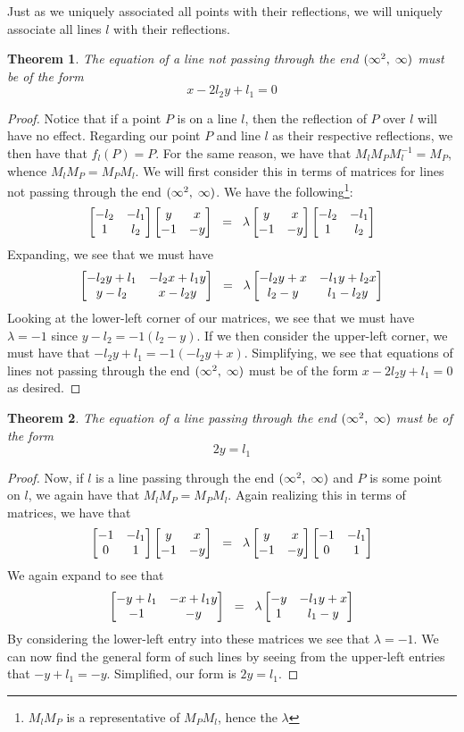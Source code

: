 \documentclass[12pt]{article}
\newcommand{\inv}{^{-1}}
\newcommand{\spceq}{\hspace{2mm} = \hspace{2mm}}
\newcommand{\ttc}{, \hspace{1mm}}
\newcommand{\lftmat}[4]{\begin{bmatrix} {#1} & {#2} \\ {#3} & {#4} \end{bmatrix}}
\newcommand{\pointmat}[2]{\lftmat{{#2}}{{#1}}{-1}{-{#2}}}
\newcommand{\stanpointmat}{\pointmat{x}{y}}
\newcommand{\linenoendmat}[2]{\begin{bmatrix} -{#2} & -{#1} \\ 1 & {#2} \end{bmatrix}}
\newcommand{\stanlinenoendmat}{\linenoendmat{l_1}{l_2}}
\newcommand{\lineendmat}[2]{\begin{bmatrix} -1 & -{#1} \\ 0 & 1 \end{bmatrix}}
\newcommand{\stanlineendmat}{\lineendmat{l_1}{l_2}}
\newcommand{\specialend}{(\infty^2\ttc\infty)}
\theoremstyle{plain}
\newtheorem{theorem}{Theorem}[section]
\theoremstyle{definition}
\begin{document}
Just as we uniquely associated all points with their reflections, we will uniquely associate all lines $l$ with their reflections.


\begin{theorem}The equation of a line not passing through the end $\specialend$ must be of the form \begin{equation}
	x - 2l_2y + l_1  = 0
\end{equation} 
\end{theorem}

\begin{proof}Notice that if a point $P$ is on a line $l$, then the reflection of $P$ over $l$ will have no effect. Regarding our point $P$ and line $l$ as their respective reflections, we then have that $f_l(P) = P$. For the same reason, we have that $M_l M_P M_l\inv = M_P$, whence $M_l M_P = M_P M_l$. We will first consider this in terms of matrices for lines not passing through the end $\specialend$. We have the following\footnote{$M_l M_P$ is a representative of $M_P M_l$, hence the $\lambda$}:
\begin{equation} 
\stanlinenoendmat\stanpointmat \spceq \lambda \stanpointmat\stanlinenoendmat
\end{equation}	
Expanding, we see that we must have
	\[
		\lftmat{-l_2y+l_1}{-l_2x+l_1y}{y-l_2}{x-l_2y} \spceq \lambda \lftmat{-l_2y+x}{-l_1y+l_2x}{l_2-y}{l_1-l_2y}
	\]
Looking at the lower-left corner of our matrices, we see that we must have $\lambda = -1$ since $y - l_2 = -1(l_2 - y)$. If we then consider the upper-left corner, we must have that $-l_2y + l_1 = -1(-l_2y + x)$. Simplifying, we see that equations of lines not passing through the end $\specialend$ must be of the form $x - 2l_2y + l_1  = 0$ as desired.
\end{proof}




\begin{theorem} The equation of a line passing through the end $\specialend$ must be of the form 
\begin{equation}
	2y = l_1
\end{equation} 
\end{theorem}

\begin{proof} Now, if $l$ is a line passing through the end $\specialend$ and $P$ is some point on $l$, we again have that $M_l M_P = M_P M_l$. Again realizing this in terms of matrices, we have that 
\begin{equation} 
	\stanlineendmat\stanpointmat \spceq \lambda \stanpointmat\stanlineendmat
\end{equation}	
We again expand to see that 
	\[
		\lftmat{-y+l_1}{-x+l_1y}{-1}{-y} \spceq \lambda \lftmat{-y}{-l_1y+x}{1}{l_1-y}
	\]
By considering the lower-left entry into these matrices we see that $\lambda = -1$. We can now find the general form of such lines by seeing from the upper-left entries that $-y+l_1 = -y$. Simplified, our form is $2y = l_1$. 
\end{proof}
\end{document}
